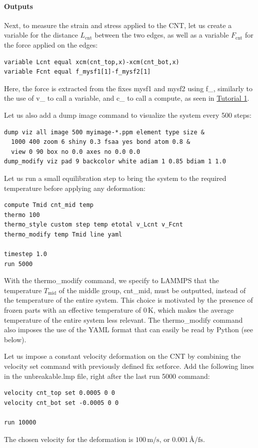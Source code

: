 \documentclass[9pt,tutorial]{livecoms}
\newcommand{\lmpcmd}[1]{\hspace{0pt}\colorbox{listing}{\textcolor{command}{\small{#1}}}\hspace{0pt}} %
\begin{document}
\paragraph{Outputs}
Next, to measure the strain and stress applied to the CNT, let us create a
variable for the distance $L_\text{cnt}$ between the two edges,
as well as a variable $F_\text{cnt}$ for the force applied on the edges:
\begin{lstlisting}
variable Lcnt equal xcm(cnt_top,x)-xcm(cnt_bot,x)
variable Fcnt equal f_mysf1[1]-f_mysf2[1]
\end{lstlisting}
Here, the force is extracted from the fixes \lmpcmd{mysf1} and \lmpcmd{mysf2}
using \lmpcmd{f\_}, similarly to the use of \lmpcmd{v\_} to call a variable,
and \lmpcmd{c\_} to call a compute, as seen in \hyperref[lennard-jones-label]{Tutorial 1}.

Let us also add a \lmpcmd{dump image} command to visualize the system
every 500 steps:
\begin{lstlisting}
dump viz all image 500 myimage-*.ppm element type size &
  1000 400 zoom 6 shiny 0.3 fsaa yes bond atom 0.8 &
  view 0 90 box no 0.0 axes no 0.0 0.0
dump_modify viz pad 9 backcolor white adiam 1 0.85 bdiam 1 1.0
\end{lstlisting}
Let us run a small equilibration step to bring the system to the required
temperature before applying any deformation:
\begin{lstlisting}
compute Tmid cnt_mid temp
thermo 100
thermo_style custom step temp etotal v_Lcnt v_Fcnt
thermo_modify temp Tmid line yaml

timestep 1.0
run 5000
\end{lstlisting}
With the \lmpcmd{thermo\_modify} command, we specify to LAMMPS that the
temperature $T_\mathrm{mid}$ of the middle group, \lmpcmd{cnt\_mid},
must be outputted, instead of the temperature of the entire system.
This choice is motivated by the presence of
frozen parts with an effective temperature of 0\,K, which makes the average
temperature of the entire system less relevant.  The \lmpcmd{thermo\_modify}
command also imposes the use of the YAML format that can easily be read by
Python (see below).

Let us impose a constant velocity deformation on the CNT
by combining the \lmpcmd{velocity set} command with previously defined
\lmpcmd{fix setforce}.  Add the following lines in the \lmpcmd{unbreakable.lmp}
file, right after the last \lmpcmd{run 5000} command:
\begin{lstlisting}
velocity cnt_top set 0.0005 0 0
velocity cnt_bot set -0.0005 0 0

run 10000
\end{lstlisting}
The chosen velocity for the deformation is $100\,\text{m/s}$, or
$0.001\,\text{\AA{}/fs}$.
\end{document}
